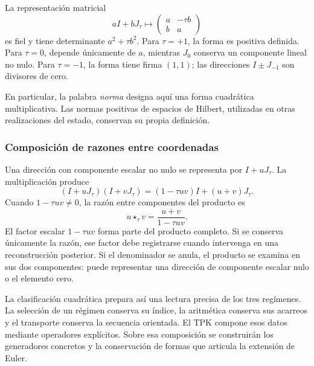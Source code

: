 La representación matricial
\[
 aI+bJ_\tau\longmapsto
 \begin{pmatrix}a&-\tau b\\b&a\end{pmatrix}
\]
es fiel y tiene determinante \(a^2+\tau b^2\). Para \(\tau=+1\), la
forma es positiva definida. Para \(\tau=0\), depende únicamente de
\(a\), mientras \(J_0\) conserva un componente lineal no nulo. Para
\(\tau=-1\), la forma tiene firma \((1,1)\); las direcciones
\(I\pm J_{-1}\) son divisores de cero.

En particular, la palabra \emph{norma} designa aquí una forma cuadrática
multiplicativa. Las normas positivas de espacios de Hilbert, utilizadas
en otras realizaciones del estado, conservan su propia definición.

\subsubsection{Composición de razones entre coordenadas}

Una dirección con componente escalar no nulo se representa por
\(I+uJ_\tau\). La multiplicación produce
\[
 (I+uJ_\tau)(I+vJ_\tau)
 =(1-\tau uv)I+(u+v)J_\tau.
\]
Cuando \(1-\tau uv\ne0\), la razón entre componentes del producto es
\begin{equation}
 u\star_\tau v=\frac{u+v}{1-\tau uv}.
\label{trit:eq:razones}
\end{equation}
El factor escalar \(1-\tau uv\) forma parte del producto completo.
Si se conserva únicamente la razón, ese factor debe registrarse cuando
intervenga en una reconstrucción posterior. Si el denominador se anula,
el producto se examina en sus dos componentes: puede representar una
dirección de componente escalar nulo o el elemento cero.

La clasificación cuadrática prepara así una lectura precisa de los tres
regímenes. La selección de un régimen conserva su índice, la aritmética
conserva sus acarreos y el transporte conserva la secuencia orientada.
El TPK compone esos datos mediante operadores explícitos. Sobre esa
composición se construirán los generadores concretos y la conservación
de formas que articula la extensión de Euler.
